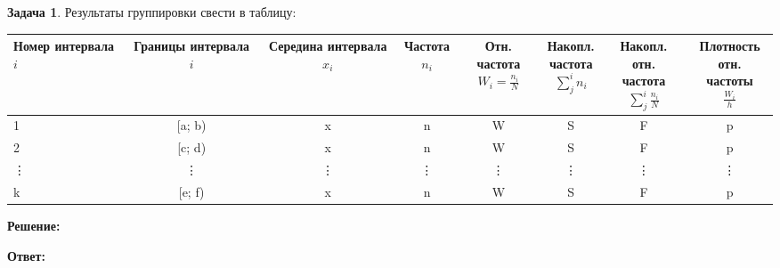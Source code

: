 \documentclass[a4paper,12pt]{article}
\theoremstyle{definition}
\newtheorem{problem}{Задача}
\newenvironment{solution}
{\begin{shaded}\textbf{Решение:}\par}
{\end{shaded}}
\newenvironment{answer}
{\par\noindent\textbf{Ответ:} \color{blue}}
{\par}
\begin{document}
\vspace{8pt}
\begin{problem}
    Результаты группировки свести в таблицу:

    \begin{table}[ht]
        \centering
         \label{tab:interval_distribution}
        \begin{adjustbox}{max width=\textwidth}
            \begin{tabular}{l c c c c c c c}
                \toprule
                \makecell{Номер\\интервала \( i \)} & 
                \makecell{Границы \\ интервала \( i \)} & 
                \makecell{Середина\\интервала \( x_i \)} & 
                \makecell{Частота\\\( n_i \)} & 
                \makecell{Отн. частота\\\( W_i = \frac{n_i}{N} \)} & 
                \makecell{Накопл.\\частота\\\( \sum^i_j n_i \)} & 
                \makecell{Накопл. отн.\\частота\\\( \sum^i_j \frac{n_i}{N} \)} & 
                \makecell{Плотность\\отн. частоты\\\( \frac{W_i}{h} \)} \\
                \midrule
                1 & [a; b) & x & n & W & S & F & p \\
                2 & [c; d) & x & n & W & S & F & p \\
                \vdots & \vdots & \vdots & \vdots & \vdots & \vdots & \vdots & \vdots \\
                k & [e; f) & x & n & W & S & F & p \\
                \bottomrule
            \end{tabular}
            \end{adjustbox}
        \end{table}  
    
        \begin{solution}
        \end{solution}
    
        \begin{answer}
        \end{answer}
    
    \end{problem}
\end{document}
